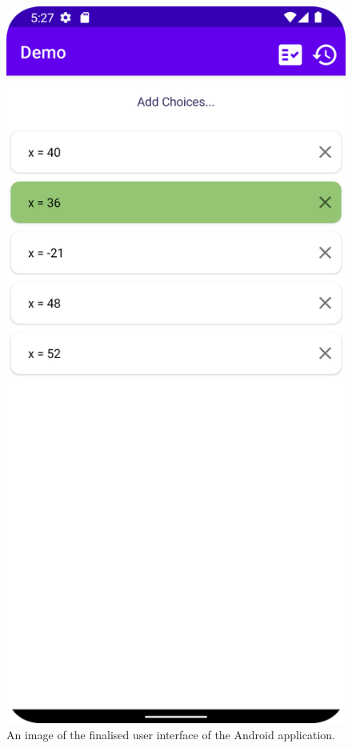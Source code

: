 \begin{figure}[ht!]
	\centering


	\includegraphics[width=0.8\linewidth]{./figures/ui.png}
	
	\caption[The UI of the Android Application]{An image of the finalised user interface of the Android application.}
	
	\label{fig:ui}
	
\end{figure}